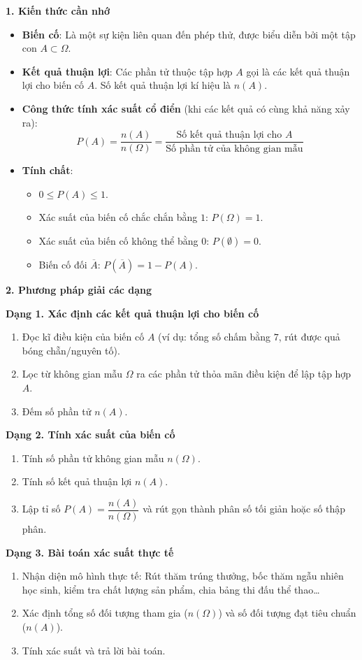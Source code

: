 \textbf{1. Kiến thức cần nhớ}
\begin{itemize}
\item \textbf{Biến cố}: Là một sự kiện liên quan đến phép thử, được biểu diễn bởi một tập con $A \subset \Omega$.
\item \textbf{Kết quả thuận lợi}: Các phần tử thuộc tập hợp $A$ gọi là các kết quả thuận lợi cho biến cố $A$. Số kết quả thuận lợi kí hiệu là $n(A)$.
\item \textbf{Công thức tính xác suất cổ điển} (khi các kết quả có cùng khả năng xảy ra):
$$\boxed{P(A) = \dfrac{n(A)}{n(\Omega)} = \dfrac{\text{Số kết quả thuận lợi cho } A}{\text{Số phần tử của không gian mẫu}}}$$
\item \textbf{Tính chất}:
\begin{itemize}
\item $0 \le P(A) \le 1$.
\item Xác suất của biến cố chắc chắn bằng $1$: $P(\Omega) = 1$.
\item Xác suất của biến cố không thể bằng $0$: $P(\emptyset) = 0$.
\item Biến cố đối $\overline{A}$: $\boxed{P(\overline{A}) = 1 - P(A)}$.
\end{itemize}
\end{itemize}

\textbf{2. Phương pháp giải các dạng}

\textbf{Dạng 1. Xác định các kết quả thuận lợi cho biến cố}
\begin{enumerate}
\item Đọc kĩ điều kiện của biến cố $A$ (ví dụ: tổng số chấm bằng $7$, rút được quả bóng chẵn/nguyên tố).
\item Lọc từ không gian mẫu $\Omega$ ra các phần tử thỏa mãn điều kiện để lập tập hợp $A$.
\item Đếm số phần tử $n(A)$.
\end{enumerate}

\textbf{Dạng 2. Tính xác suất của biến cố}
\begin{enumerate}
\item Tính số phần tử không gian mẫu $n(\Omega)$.
\item Tính số kết quả thuận lợi $n(A)$.
\item Lập tỉ số $P(A) = \dfrac{n(A)}{n(\Omega)}$ và rút gọn thành phân số tối giản hoặc số thập phân.
\end{enumerate}

\textbf{Dạng 3. Bài toán xác suất thực tế}
\begin{enumerate}
\item Nhận diện mô hình thực tế: Rút thăm trúng thưởng, bốc thăm ngẫu nhiên học sinh, kiểm tra chất lượng sản phẩm, chia bảng thi đấu thể thao\dots
\item Xác định tổng số đối tượng tham gia ($n(\Omega)$) và số đối tượng đạt tiêu chuẩn ($n(A)$).
\item Tính xác suất và trả lời bài toán.
\end{enumerate}
